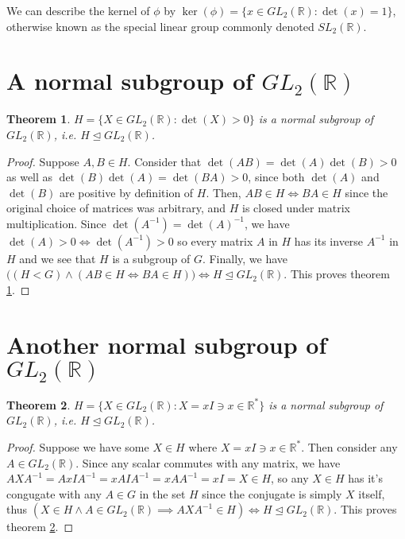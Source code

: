 \documentclass[12pt]{article}
\newcommand{\reals}{\mathbb{R}}
\newcommand{\gltwo}{GL_2(\reals)}
\newtheorem{thm}{Theorem}
\begin{document}
We can describe the kernel of $\phi$ by
$\ker(\phi) = \{ x \in \gltwo: \det(x) = 1 \}$,
otherwise known as the special linear group commonly denoted $SL_2(\reals)$.

\section{A normal subgroup of $\gltwo$}

\begin{thm} \label{thm8}
	$H = \{ X \in \gltwo: \det(X) > 0 \}$ is a normal subgroup of $\gltwo$,
	i.e. $H \trianglelefteq \gltwo$.
\end{thm}

\begin{proof}
	Suppose $A,B \in H$.
	Consider that $\det(AB) = \det(A)\det(B) > 0$
	as well as $\det(B)\det(A) = \det(BA) > 0$,
	since both $\det(A)$ and $\det(B)$ are positive by definition of $H$.
	Then, $AB \in H \iff BA \in H$ since the original choice of matrices was arbitrary,
	and $H$ is closed under matrix multiplication.
	Since $\det(A^{-1}) = \det(A)^{-1}$, we have $\det(A) > 0 \iff \det(A^{-1}) > 0$
	so every matrix $A$ in $H$ has its inverse $A^{-1}$ in $H$ and
	we see that $H$ is a subgroup of $G$.
	Finally, we have $\Big((H < G) \land (AB \in H \iff BA \in H)\Big) \iff H \trianglelefteq \gltwo$.
	This proves theorem \ref{thm8}.
\end{proof}

\section{Another normal subgroup of $\gltwo$}

\begin{thm} \label{thm9}
	$H = \{ X \in \gltwo: X = xI \ni x \in \reals^*\}$ is a normal subgroup of $\gltwo$,
	i.e. $H \trianglelefteq \gltwo$.
\end{thm}

\begin{proof}
	Suppose we have some $X \in H$ where $X = xI \ni x \in \reals^*$.
	Then consider any $A \in \gltwo$.
	Since any scalar commutes with any matrix,
	we have $AXA^{-1} = AxIA^{-1} = xAIA^{-1} = xAA^{-1} = xI = X \in H$,
	so any $X \in H$ has it's congugate with any $A \in G$ in the set
	$H$ since the conjugate is simply $X$ itself,
	thus $(X \in H \land A \in \gltwo \implies AXA^{-1} \in H) \iff H \trianglelefteq \gltwo$.
	This proves theorem \ref{thm9}.
\end{proof}
\end{document}
